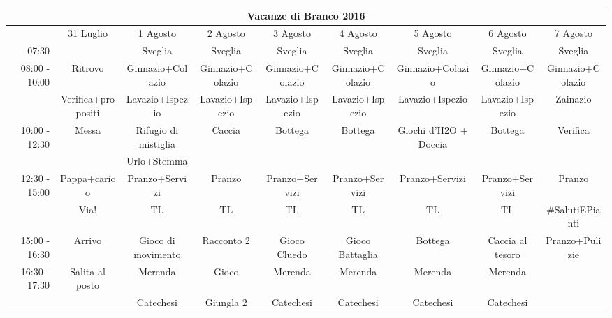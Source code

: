\begin{landscape}
\begin{adjustwidth}{-2.5cm}{-1cm}%
 \begin{tabular}{|r|c|c|c|c|c|c|c|c|}
 \hline
 \multicolumn{9}{|c|}{Vacanze di Branco 2016}\\
 \hline
        &31 Luglio&1 Agosto&2 Agosto&3 Agosto&4 Agosto&5 Agosto&6 Agosto&7 Agosto\\ \hline
        07:30& &Sveglia&Sveglia&Sveglia&Sveglia&Sveglia&Sveglia&Sveglia\\ \hline
        
        \multirow{2}{*}{08:00 - 10:00}&Ritrovo&Ginnazio+Colazio&Ginnazio+Colazio&Ginnazio+Colazio&Ginnazio+Colazio&Ginnazio+Colazio&Ginnazio+Colazio&Ginnazio+Colazio\\
        &Verifica+propositi&Lavazio+Ispezio&Lavazio+Ispezio&Lavazio+Ispezio&Lavazio+Ispezio&Lavazio+Ispezio&Lavazio+Ispezio&Zainazio\\ \hline
        
        \multirow{2}{*}{10:00 - 12:30}&Messa&Rifugio di mistiglia&Caccia&Bottega&Bottega&Giochi d'H2O + Doccia&Bottega&Verifica\\
        & &Urlo+Stemma& & & & & &\\ \hline
        
        \multirow{2}{*}{12:30 - 15:00}&Pappa+carico&Pranzo+Servizi&Pranzo&Pranzo+Servizi&Pranzo+Servizi&Pranzo+Servizi&Pranzo+Servizi&Pranzo\\&Via!&TL&TL&TL&TL&TL&TL&\#SalutiEPianti\\ \hline
    
        15:00 - 16:30&Arrivo&Gioco di movimento&Racconto 2&Gioco Cluedo&Gioco Battaglia&Bottega&Caccia al tesoro&Pranzo+Pulizie\\ \hline
    
        \multirow{2}{*}{16:30 - 17:30}&Salita al posto&Merenda&Gioco&Merenda&Merenda&Merenda&Merenda&\\& &Catechesi&Giungla 2&Catechesi&Catechesi&Catechesi&Catechesi&\\ \hline
        \end{tabular}  
        \end{adjustwidth}
\end{landscape}

